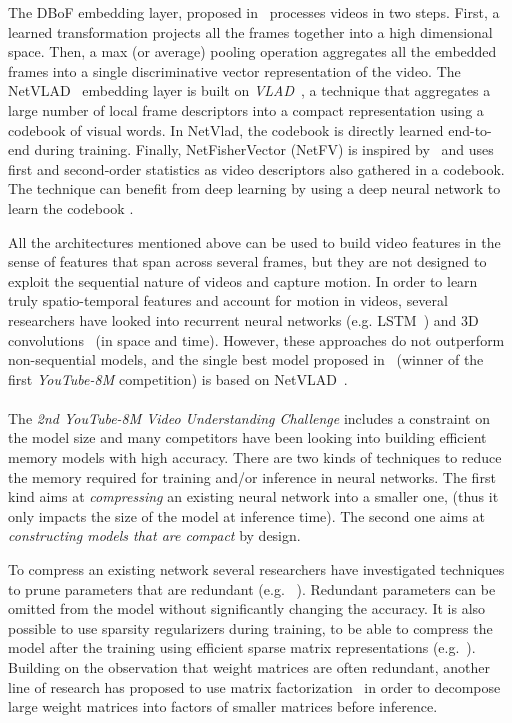 \documentclass[runningheads]{llncs}
\newcommand{\yt}{\textit{YouTube-8M}\xspace}
\begin{document}
The DBoF embedding layer, proposed in~\cite{45619} processes videos in two steps.
First, a learned transformation projects all the frames together into a high dimensional space.
Then, a max (or average) pooling operation aggregates all the embedded frames into a single discriminative vector  representation of the video.  The NetVLAD~\cite{Arandjelovic16} embedding layer is built on {\em VLAD}~\cite{jegou:inria-00548637}, a technique that aggregates a large number of local frame descriptors into a compact representation using a codebook of visual words. In NetVlad, the codebook is directly learned end-to-end during training. Finally, NetFisherVector (NetFV) is inspired by~\cite{4270291} and uses  first and second-order statistics as video descriptors also gathered in a codebook. The technique can benefit from deep learning by using a deep neural network to learn the codebook \cite{DBLP:journals/corr/MiechLS17}.

All the architectures mentioned above can be used to build video features in the sense of features that span across several frames, but they are not designed to exploit the sequential nature of videos and capture motion.  In order to learn truly spatio-temporal features and account for motion in videos, several researchers have looked into recurrent neural networks (e.g. LSTM~\cite{yue2015beyond,DBLP:journals/corr/LiGLBLLLZW17}) and 3D convolutions~\cite{karpathy2014large} (in space and time).
However, these approaches do not  outperform non-sequential models, and  the single best model proposed in~\cite{DBLP:journals/corr/MiechLS17} (winner of the first \yt competition) is based on NetVLAD~\cite{Arandjelovic16}.

\paragraph{}
The \textit{2nd YouTube-8M Video Understanding Challenge} includes a constraint on the model size and many competitors have been looking into building efficient memory models with high accuracy.
There are two kinds of techniques to reduce the memory required for training and/or inference in neural networks. The first kind aims at \textit{compressing} an existing neural network into a smaller one, (thus it only impacts the size of the model at inference time). The second one aims at {\em constructing models that are compact} by design.

To compress an existing network several researchers have investigated techniques to prune parameters that are redundant (e.g. ~\cite{pmlr-v80-dai18d,han2015deep_compression,NIPS2017_6813}). Redundant parameters can be omitted from the model without significantly changing the accuracy. It is also possible to use sparsity regularizers during training, to be able to compress the model after the training using efficient sparse matrix representations (e.g.~\cite{Collins2014MemoryBD,pmlr-v80-dai18d,7298681}). Building on the observation that weight matrices are often redundant, another line of research has proposed to use matrix factorization~\cite{NIPS2013_5025,Jaderberg2014SpeedingUC,8099498} in order to decompose large weight matrices into factors of smaller matrices before inference.
\end{document}
